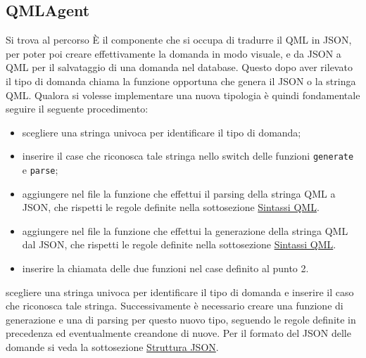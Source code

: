 \documentclass[a4paper, titlepage]{article}
\begin{document}
	\subsection{QMLAgent}
	Si trova al percorso  
	È il componente che si occupa di tradurre il QML in JSON, per poter poi creare effettivamente la domanda in modo visuale, e da JSON a QML per il salvataggio di una domanda nel database.
	Questo dopo aver rilevato il tipo di domanda chiama la funzione opportuna che genera il JSON o la stringa QML.
	Qualora si volesse implementare una nuova tipologia è quindi fondamentale seguire il seguente procedimento:
	\begin{itemize}
		\item scegliere una stringa univoca per identificare il tipo di domanda;
		\item inserire il case che riconosca tale stringa nello switch delle funzioni \texttt{generate} e \texttt{parse};
		\item aggiungere nel file la funzione che effettui il parsing della stringa QML a JSON, che rispetti le regole definite nella sottosezione \hyperref[qml]{Sintassi QML}.
		\item aggiungere nel file la funzione che effettui la generazione della stringa QML dal JSON, che rispetti le regole definite nella sottosezione \hyperref[qml]{Sintassi QML}.
		\item inserire la chiamata delle due funzioni nel case definito al punto 2.
	\end{itemize}
	scegliere una stringa univoca per identificare il tipo di domanda e inserire il caso che riconosca tale stringa.
	Successivamente è necessario creare una funzione di generazione e una di parsing per questo nuovo tipo, seguendo le regole definite in precedenza ed eventualmente creandone di nuove.
	Per il formato del JSON delle domande si veda la sottosezione \hyperref[qson]{Struttura JSON}.
	
\end{document}
